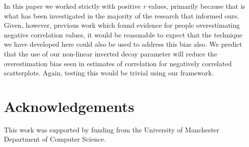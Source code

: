 \documentclass[preprint, 3p,
authoryear]{elsarticle} %
\begin{document}
In this paper we worked strictly with positive \emph{r} values,
primarily because that is what has been investigated in the majority of
the research that informed ours. Given, however, previous work
\citep{sher_2017} which found evidence for people overestimating
negative correlation values, it would be reasonable to expect that the
technique we have developed here could also be used to address this bias
also. We predict that the use of our non-linear inverted decay parameter
will reduce the overestimation bias seen in estimates of correlation for
negatively correlated scatterplots. Again, testing this would be trivial
using our framework.

\hypertarget{acknowledgements}{%
\section{Acknowledgements}\label{acknowledgements}}

This work was supported by funding from the University of Manchester
Department of Computer Science.

\renewcommand\refname{References}

\end{document}
